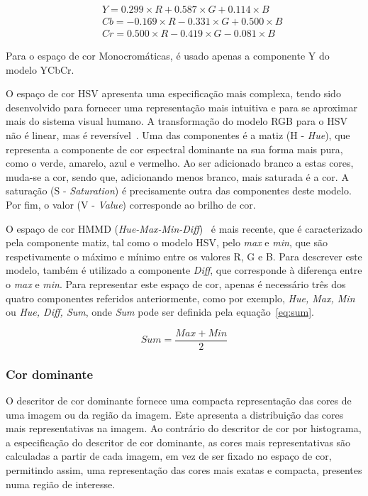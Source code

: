 \begin{eqnarray}
&& Y = 0.299\times R + 0.587\times G + 0.114\times B\nonumber\\
&& Cb = -0.169\times R - 0.331\times G + 0.500\times B \nonumber\\
&& Cr = 0.500\times R - 0.419\times G - 0.081\times B \label{eq:ycbcr}
\end{eqnarray} 

Para o espaço de cor Monocromáticas, é usado apenas a componente Y do modelo YCbCr. 

O espaço de cor HSV apresenta uma especificação mais complexa, tendo sido desenvolvido para fornecer uma representação mais intuitiva e para se aproximar mais do sistema visual humano. A transformação do modelo RGB para o HSV não é linear, mas é reversível~\cite{Manjunath2001}. Uma das componentes é a matiz (H - \textit{Hue}), que representa a componente de cor espectral dominante na sua forma mais pura, como o verde, amarelo, azul e vermelho. Ao ser adicionado branco a estas cores, muda-se a cor, sendo que, adicionando menos branco, mais saturada é a cor. A saturação (S - \textit{Saturation}) é precisamente outra das componentes deste modelo. Por fim, o valor (V - \textit{Value}) corresponde ao brilho de cor.

O espaço de cor HMMD (\textit{Hue-Max-Min-Diff})~\cite{Manjunath2001, Ite-vil} é mais recente, que é caracterizado pela componente matiz, tal como o modelo HSV, pelo \textit{max} e \textit{min}, que são respetivamente o máximo e mínimo entre os valores R, G e B. Para descrever este modelo, também é utilizado a componente \textit{Diff}, que corresponde à diferença entre o \textit{max} e \textit{min}. Para representar este espaço de cor, apenas é necessário três dos quatro componentes referidos anteriormente, como por exemplo, {\textit{Hue, Max, Min}} ou {\textit{Hue, Diff, Sum}}, onde \textit{Sum} pode ser definida pela equação~\ref{eq:sum}.

\begin{equation}
Sum = \frac{Max + Min}{2}
\label{eq:sum}
\end{equation}

\subsubsection{Cor dominante}

O descritor de cor dominante fornece uma compacta representação das cores de uma imagem ou da região da imagem. Este apresenta a distribuição das cores mais representativas na imagem. Ao contrário do descritor de cor por histograma, a especificação do descritor de cor dominante, as cores mais representativas são calculadas a partir de cada imagem, em vez de ser fixado no espaço de cor, permitindo assim, uma representação das cores mais exatas e compacta, presentes numa região de interesse.

